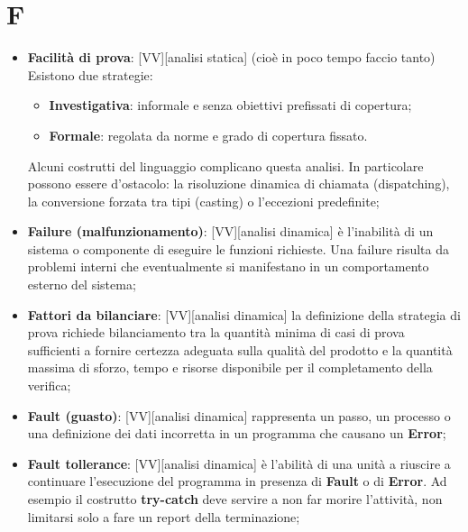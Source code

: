 % 
%
% 
%

\section{F}
	\begin{itemize}

		\item \textbf{Facilità di prova}: [VV][analisi statica] (cioè in poco tempo faccio tanto) Esistono due strategie:
			\begin{itemize}
				\item \textbf{Investigativa}: informale e senza obiettivi prefissati di copertura;
				\item \textbf{Formale}: regolata da norme e grado di copertura fissato.
			\end{itemize}
			\noindent
			Alcuni costrutti del linguaggio complicano questa analisi. In particolare possono essere d'ostacolo: la risoluzione dinamica di chiamata (dispatching), la conversione forzata tra tipi (casting) o l'eccezioni predefinite;

		\item \textbf{Failure (malfunzionamento)}: [VV][analisi dinamica] è l'inabilità di un sistema o componente di eseguire le funzioni richieste. Una failure risulta da problemi interni che eventualmente si manifestano in un comportamento esterno del sistema;

		\item \textbf{Fattori da bilanciare}: [VV][analisi dinamica] la definizione della strategia di prova richiede bilanciamento tra la quantità minima di casi di prova sufficienti a fornire certezza adeguata sulla qualità del prodotto e la quantità massima di sforzo, tempo e risorse disponibile per il completamento della verifica;

		\item \textbf{Fault (guasto)}: [VV][analisi dinamica] rappresenta un passo, un processo o una definizione dei dati incorretta in un programma che causano un \textbf{Error};
		\item \textbf{Fault tollerance}: [VV][analisi dinamica] è l'abilità di una unità a riuscire a continuare l'esecuzione del programma in presenza di \textbf{Fault} o di \textbf{Error}. Ad esempio il costrutto \textbf{try-catch} deve servire a non far morire l'attività, non limitarsi solo a fare un report della terminazione;


\end{itemize}
